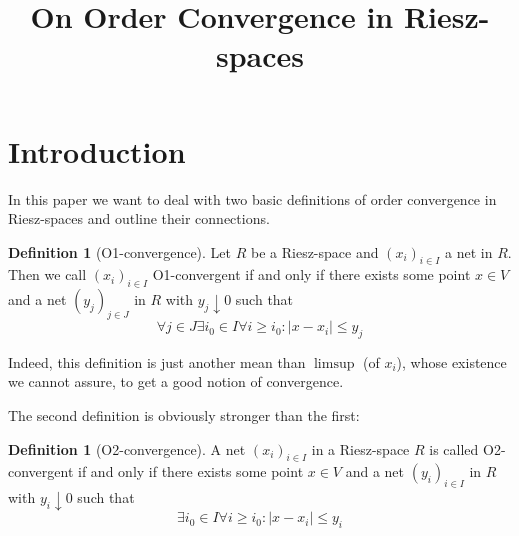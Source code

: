 \message{ !name(OnOrderConvergence.tex)}\documentclass{article}
\theoremstyle{definition}
\newtheorem{definition}[theorem]{Definition}
\theoremstyle{remark}
\renewcommand{\mod}[1]{\left| #1\right|} %
\begin{document}



\title{On Order Convergence in Riesz-spaces}








\maketitle

\tableofcontents

\section{Introduction}

In this paper we want to deal with two basic definitions of order convergence in Riesz-spaces and outline their connections.

\begin{definition}[O1-convergence]\label{o1}
Let $R$ be a Riesz-space and $(x_i)_{i\in I}$ a net in $R$. Then we call $(x_i)_{i\in I}$ O1-convergent if and only if there exists some point $x\in V$ and a net $(y_j)_{j\in J}$ in $R$ with $y_j\downarrow 0$ such that
\begin{equation}
\forall j\in J \exists i_0\in I \forall i\geq i_0 : \mod{x-x_i}\leq y_j
\end{equation}
\end{definition}

Indeed, this definition is just another mean than $\limsup$ (of $x_i$), whose existence we cannot assure, to get a good notion of convergence.

The second definition is obviously stronger than the first:

\begin{definition}[O2-convergence]\label{o2}
A net $(x_i)_{i\in I}$ in a Riesz-space $R$ is called O2-convergent if and only if there exists some point $x\in V$ and a net $(y_i)_{i\in I}$ in $R$ with $y_i\downarrow 0$ such that
\begin{equation}
\exists i_0\in I \forall i\geq i_0 : \mod{x-x_i}\leq y_i
\end{equation}
\end{definition}
\end{document}

